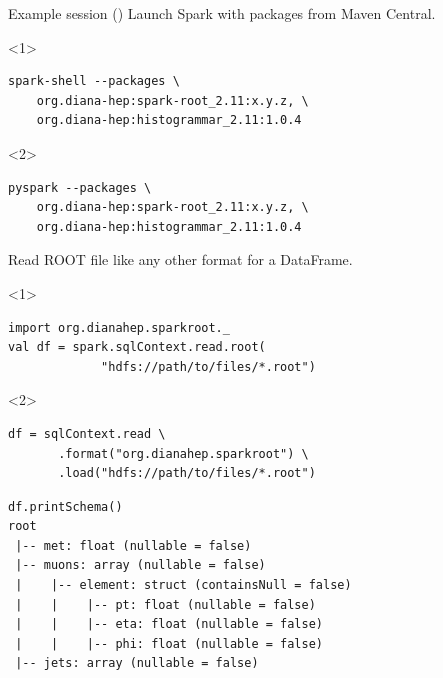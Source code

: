 \documentclass{beamer}
\begin{document}
\begin{frame}[fragile]{Example session ()}
\vspace{0.5 cm}
Launch Spark with packages from Maven Central.
\small
\begin{onlyenv}<1>
\begin{verbatim}
spark-shell --packages \
    org.diana-hep:spark-root_2.11:x.y.z, \
    org.diana-hep:histogrammar_2.11:1.0.4
\end{verbatim}
\end{onlyenv}
\begin{onlyenv}<2>
\begin{verbatim}
pyspark --packages \
    org.diana-hep:spark-root_2.11:x.y.z, \
    org.diana-hep:histogrammar_2.11:1.0.4
\end{verbatim}
\end{onlyenv}

\normalsize
Read ROOT file like any other format for a DataFrame.

\small
\begin{onlyenv}<1>
\begin{verbatim}
import org.dianahep.sparkroot._
val df = spark.sqlContext.read.root(
             "hdfs://path/to/files/*.root")
\end{verbatim}
\end{onlyenv}
\begin{onlyenv}<2>
\begin{verbatim}
df = sqlContext.read \
       .format("org.dianahep.sparkroot") \
       .load("hdfs://path/to/files/*.root")
\end{verbatim}
\end{onlyenv}

\begin{verbatim}
df.printSchema()
root
 |-- met: float (nullable = false)
 |-- muons: array (nullable = false)
 |    |-- element: struct (containsNull = false)
 |    |    |-- pt: float (nullable = false)
 |    |    |-- eta: float (nullable = false)
 |    |    |-- phi: float (nullable = false)
 |-- jets: array (nullable = false)
\end{verbatim}
\end{frame}
\end{document}
